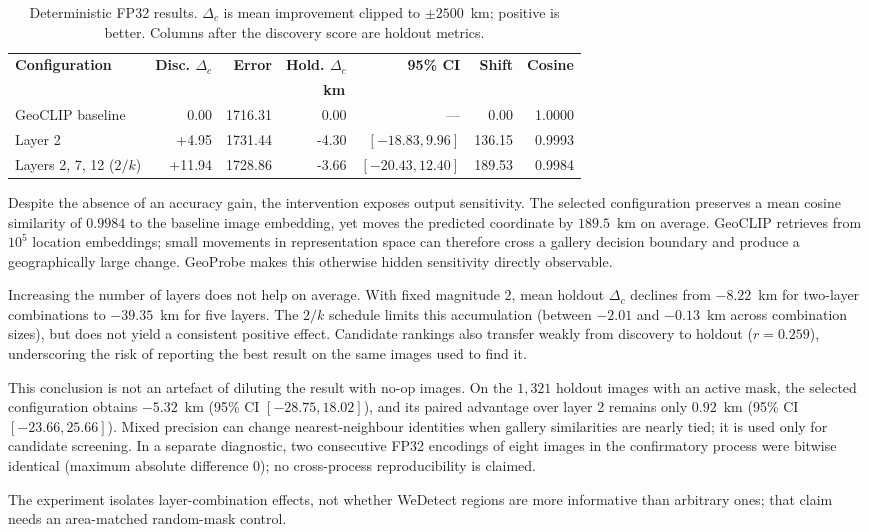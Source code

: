 \begin{table}[t]
\centering
\caption{Deterministic FP32 results. $\Delta_c$ is mean improvement clipped to
$\pm2500$~km; positive is better. Columns after the discovery score are holdout
metrics.}
\label{tab:main}
\small
\setlength{\tabcolsep}{2.5pt}
\begin{tabular}{l|rrrrrr}
\toprule
\textbf{Configuration} &
\textbf{Disc. $\Delta_c$} & \textbf{Error} & \textbf{Hold. $\Delta_c$} &
\textbf{95\% CI} & \textbf{Shift} &
\textbf{Cosine} \\
 & \multicolumn{5}{c}{\textbf{km}} & \\
\midrule
GeoCLIP baseline & 0.00 & 1716.31 & 0.00 & --- & 0.00 & 1.0000 \\
Layer 2 & +4.95 & 1731.44 & -4.30 & $[-18.83,9.96]$ & 136.15 & 0.9993 \\
Layers 2, 7, 12 ($2/k$) & +11.94 & 1728.86 & -3.66 & $[-20.43,12.40]$ & 189.53 & 0.9984 \\
\bottomrule
\end{tabular}
\end{table}

Despite the absence of an accuracy gain, the intervention exposes output
sensitivity. The selected configuration preserves a mean cosine similarity of
$0.9984$ to the baseline image embedding, yet moves the predicted coordinate
by $189.5$~km on average. GeoCLIP retrieves from $10^5$ location embeddings;
small movements in representation space can therefore cross a gallery
decision boundary and produce a geographically large change. GeoProbe makes
this otherwise hidden sensitivity directly observable.

Increasing the number of layers does not help on average. With fixed magnitude
$2$, mean holdout $\Delta_c$ declines from $-8.22$~km for two-layer
combinations to $-39.35$~km for five layers. The $2/k$ schedule limits this
accumulation (between $-2.01$ and $-0.13$~km across combination sizes), but
does not yield a consistent positive effect. Candidate rankings also transfer
weakly from discovery to holdout ($r=0.259$), underscoring the risk of
reporting the best result on the same images used to find it.

This conclusion is not an artefact of diluting the result with no-op images.
On the $1{,}321$ holdout images with an active mask, the selected configuration
obtains $-5.32$~km (95\% CI $[-28.75,18.02]$), and its paired advantage over
layer 2 remains only $0.92$~km (95\% CI $[-23.66,25.66]$). Mixed precision can
change nearest-neighbour identities when gallery similarities are nearly tied;
it is used only for candidate screening. In a separate diagnostic, two
consecutive FP32 encodings of eight images in the confirmatory process were
bitwise identical (maximum absolute difference $0$); no cross-process
reproducibility is claimed.

The experiment isolates layer-combination effects, not whether WeDetect regions
are more informative than arbitrary ones; that claim needs an area-matched
random-mask control.
